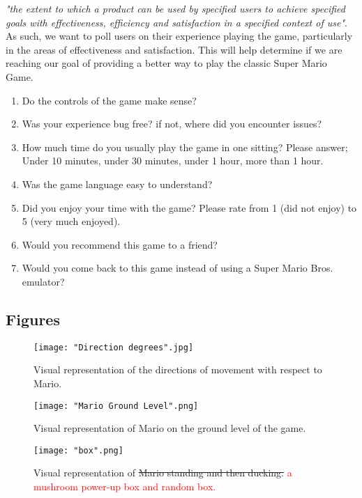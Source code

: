 \documentclass[12pt, titlepage]{article}
\begin{document}
\emph{"the extent to which a product can be used by specified users to achieve specified goals with effectiveness, efficiency and satisfaction in a specified context of use"}.\\

As such, we want to poll users on their experience playing the game, particularly in the areas of effectiveness and satisfaction. This will help determine if we are reaching our goal of providing a better way to play the classic Super Mario Game.

\begin{enumerate}
    \item Do the controls of the game make sense?
    \item Was your experience bug free? if not, where did you encounter issues?
    \item How much time do you usually play the game in one sitting? Please answer; Under 10 minutes, under 30 minutes, under 1 hour, more than 1 hour.
    \item Was the game language easy to understand?
    \item Did you enjoy your time with the game? Please rate from 1 (did not enjoy) to 5 (very much enjoyed).
    \item Would you recommend this game to a friend?
    \item Would you come back to this game instead of using a Super Mario Bros. emulator?
\end{enumerate}

\subsection{Figures}
\begin{figure}[!h]
    \centering
    \texttt{[image: "Direction degrees".jpg]}
    \caption{Visual representation of the directions of movement with respect to Mario.}
\end{figure}

\begin{figure}[!h]
    \centering
    \texttt{[image: "Mario Ground Level".png]}
    \caption{Visual representation of Mario on the ground level of the game.}
\end{figure}

\begin{figure}[!h]
    \centering
    \texttt{[image: "box".png]}
    \caption{Visual representation of \sout{Mario standing and then ducking.} \textcolor{red}{a mushroom power-up box and random box.}}
\end{figure}
\end{document}
